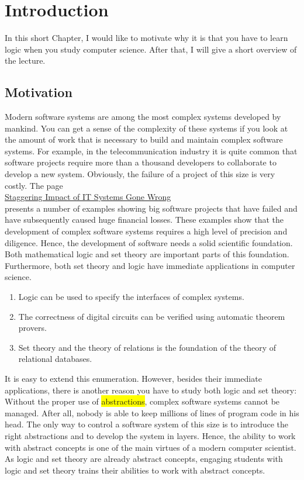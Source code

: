 \chapter{Introduction}
In this short Chapter, I would like to motivate why it is that you have to learn logic when you study computer
science.  After that, I will give a short overview of the lecture.

\section{Motivation}
Modern software systems are among the most complex systems developed by mankind.  You can get a
sense of the complexity of these systems if you look at the amount of work that is necessary to
build and maintain complex software systems.  For example, in the telecommunication industry it is 
quite common that software projects require more than a thousand developers to collaborate to
develop a new system.  Obviously, the failure of a project of this size is very costly.
The page
\\[0.2cm]
\hspace*{1.3cm}
\href{http://spectrum.ieee.org/static/the-staggering-impact-of-it-systems-gone-wrong}{Staggering Impact of IT Systems Gone Wrong}
\\[0.2cm]
presents a number of examples showing big software projects that have failed and have subsequently caused huge
financial losses.  These examples show that the development of complex software systems requires a high level
of precision and diligence.  Hence, the development of software needs a solid scientific
foundation.  Both mathematical logic and set theory are important parts of this foundation.
Furthermore, both set theory and logic have immediate applications in computer science.
\begin{enumerate}
\item Logic can be used to specify the interfaces of complex systems.  
\item The correctness of digital circuits can be verified using automatic theorem provers.
\item Set theory and the theory of relations is the foundation of the theory of relational databases.
\end{enumerate}
It is easy to extend this enumeration.  However, besides their immediate applications, 
there is another reason you have to study both logic and set theory: Without the proper use of
\colorbox{yellow}{abstractions}, complex software systems cannot be managed.  After all, nobody is able to keep
millions of lines of program code in his head.  The only way to control a software system of this
size is to introduce the right abstractions and to develop the system in layers.  Hence, the ability
to work with abstract concepts is one of the main virtues of a modern computer scientist.  As logic
and set theory are already abstract concepts, engaging students with logic and set theory trains
their abilities to work with abstract concepts.

